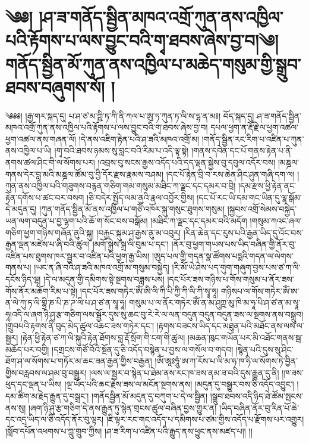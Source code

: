 \setcounter{footnote}{0} 
\chapter{༄༅། །ཤ་ཟ་གནོད་སྦྱིན་མཁའ་འགྲོ་ཀུན་ནས་འཁྱིལ་པའི་རྟོགས་པ་ལས་བྱུང་བའི་གྭ་ཐབས་ཞེས་བྱ་བ།༄། གནོད་སྦྱིན་མོ་ཀུན་ནས་འཁྱིལ་པ་མཆེད་གསུམ་གྱི་སྒྲུབ་ཐབས་བཞུགས་སོ། །}༄༅༅། །རྒྱ་གར་སྐད་དུ། པ་ཤ་ཙ་མ་ཀྵི་ཏ་ཀི་ནི་ཀལ་པ་ཨུ་ཏ་ཀུན་ཏ་ལི་ས་དྷ་ན་མཿ། བོད་སྐད་དུ། ཤ་ཟ་གནོད་སྦྱིན་མཁའ་འགྲོ་ཀུན་ནས་འཁྱིལ་པའི་རྟོགས་པ་ལས་བྱུང་བའི་གྭ་ཐབས་ཞེས་བྱ་བ། དཔལ་ཕྱག་ན་རྡོ་རྗེ་ལ་ཕྱག་འཚལ་ཕྱག་འཚལ་ནས་གཞན་ལོ། །དེ་ནས་འཇིག་རྟེན་པའི་ཤ་ཟའི་མཁའ་འགྲོ་མ། །གནོད་སྦྱིན་རང་རིག་པ་འཛིན་པ་ཀུན་ནས་འཁྱིལ་པ་ཡི། །གྭ་བའི་ཐབས་ཉམས་སུ་བླང་བའི་རིམ་པ་འདི་ལྟ་སྟེ། །གནས་དབེན་དང་པོ་གནས་རྟེན་པ་ནི་ནགས་ཚལ་ཤིང་གི་ལ་སོགས་པར། །འབྲས་བུ་སངས་རྒྱས་འདོད་པའི་དད་ལྡན་སྐྱེས་བུ་དབུལ་འདོར་བས། །མཎྜལ་གནས་དེར་བླ་མའི་མཎྜལ་ཚོམ་བུ་བྱི་དོར་རྫས་རྣམས་བཤམ། །དང་པོ་རྟེན་བྲི་བ་རས་ཆེན་ཤིང་ཤུན་གཞི་དག་ལ། །ཀུན་ནས་འཁྱིལ་པའི་གཟུགས་བརྙན་གཅིག་གམ་གསུམ་མཐིང་ཀ་ལྗང་དང་དམར་བ་བྲི། །དམ་རྫས་ཕྱི་རྟེན་ནང་རྟེན་དགོས་པ་ཚང་བར་བསག །ཅི་བདེར་སྤྱོད་ལམ་ནྱའི་རྣལ་འབྱོར་གྱིས། །དང་པོ་རང་ཡི་དམ་གང་ཡིན་དུ་ལྷ་སྒོམ་དེ་མདུན་དུ། །ཀུན་གནོད་སྦྱིན་མོ་ནས་འཁྱིལ་པ་གཙོ་འཁོར་སྐུ་གསུང་ཐུགས་གསུམ། །སྐྱབས་འགྲོ་སེམས་བསྐྱེད་ཡན་ལག་བདུན་པ་བྱ་ལྷག་པའི་ཆོ་ག་སོང་བས་བསྒོམ། །མཐིང་ཀ་ལྗང་དང་དམར་བའི་མདོག །གསུམ་ཀའང་ཞལ་གཅིག་ཕྱག་གཉིས་གཞོན་ནུའི་སྐུ། །བརྐྱང་སྐུམ་ཤ་རྒྱས་ནུ་མ་འབུར། །རིན་ཆེན་དང་རུས་པའི་རྒྱན་ཡིད་དུ་འོང་བས་རྒྱན་ལྡན་མཛེས་པ་ཞི་བའི་ཚུལ། །མགོ་སྐྱེས་སྐྲ་ལི་བུམ་པ་དང་། །ནོར་བུ་ཕྱག་གཡས་པས་ཡིད་བཞིན་གྱི་ནོར་བུ་འཛིན་པས་ཐུགས་ཁར་སྦྱར་བ་འཛིན་པའི་ཕྱག་རྒྱ་ཡིས། །ཨུད་པལ་གྱི་གདན་སྣ་ཚོགས་པདྨའི་གདན་ལ་ལེགས་གནས་པ། །ཡང་ན་ཞི་བའི་ཤ་ཟའི་མཁའ་འགྲོ་མ་གསུམ་བསྐྱེད། །རི་མོ་ཡེ་ཤེས་པད་གུག་གཞུག་བྱས་པས་ཙ་ཀ་ལི་དངོས་ཉིད་ལྷ། །དེ་ལ་མདུན་གྱི་དམིགས་སྟེ་སྔགས་བཟླས་པས། །དང་པོར་ཟས་གཉིས་པ་གོས་གསུམ་པ་ནོར་ཟས་གོས་ནོར་མཆོག་རིམ་པ་སྟེ། །དང་པོར་ཟས་གཏེར་ཨོཾ་ཨི་ལི་ཀི་པི་ཀྱི་ཀི་ལི་ཀི་སྭཱ་ཧཱ། གཉིསཔ་ལ་གོས་གཏེར་ཨོཾ་ཨ་ན་ལེ་ཀུ་ཏ་ལི་གྷྲི་ཎ་པི་ཎ་ཌ་ལི་པ་ཤ་ཙ་ན་སྭཱ་ཧཱ། གསུམ་པ་ལ་ནོར་གཏེར་ཨོཾ་ན་མ་ཤུཀྵ་མུ་ཁི་མ་ཧཱ་པི་ཤ་ཙ་ན་མ་སྭཱ་ཧཱ།འདི་ལ་ཞག་ཉི་ཤུ་རྩ་གཅིག་ལས་སྦྱོར་དུས་སུ་ཆང་བུ་རེ་རེ་ལ་ལན་བདུན་བདུན་བདུན་ཟས་ལ་སྔགས་ནས་བསྒྲུབ། །གྲུབཔའི་རྟགས་ནི་བུད་མེད་ཚུལ་འཆང་ཟས་གཏེར་དང་། །རྟགས་བཟངས་ཡིད་དང་མཐུན་པའི་མཐོང་ནས་ལས་ལ་སྦྱར། །རྟེན་ཕྱི་རྟེན་ཙ་ཀ་ལི་སྐུའི་རྟེན་ཐོགས་བླ་རྡོ་སྲོག་གི་ངག་གི་ཚུལ། །མཆན་ཁུང་གཡོན་པར་མི་འཐོང་གནས་སྦ་མཆོད་པར་བགྱི། །དགྲངས་གཙོ་བོའི་སྔོན་དུ་ཅི་འདོད་བསྙེན་པ་བྱས་ལ་གསོལ་བ་གདབ། །སྙེན་པའི་དུས་སུ་ཤིང་ཐོག་ཤ་ལ་སོགས་པ་གཏོར་མ་ཆང་ཟན་རྒྱན་གྱིས་བརྒྱན། །ཨོཾ་ཨཱཿཧཱུཾ་ཨ་ཀ་རོས་པ་ལི་མ་ཧ་ཁ་ཧི་ལ་སོགས་ཏེ་བྱིན་གྱིས་བརླབས་ལ་ཤམ་བུ་བསྒྱུར། །ལས་ལ་སྦྱར་བ་སྙེན་པ་ཐེམ་ནས་རང་ཁ་ཟས་ནམ་ཟ་བའི་དུས་རྒྱུན་དུ་ནི། །ཁ་ཟས་ཕུད་དང་ལྡན་པ་ཡིས། །ལྔ་ཡོད་པའི་ཆང་རྗེས་ཟས་ལ་མངོན་སྔགས་ནས། །མདུན་དུ་བསྒྱུར་བས་ཅི་འདོད་འབྱུང་། །དམ་ཚིག་མ་རྗེད་རྒྱུན་དུ་བསྒྲང་། །གནོདསྦྱིན་མོ་མདུན་དུ་བཀུག་པ་དེ་ལ་སྦྱིན། །སྒྲུབ་ཐབས་འདི་ཉིད་ཐེ་ཚོམ་སྤངས་ནས་སུ། །ཞག་ཉི་ཤུ་རྩ་གཅིག་དེ་ནས་རྒྱུན་ཏུ་སྙེན་གྲངས་ཚུལ་བཞིན་བྱས་གྱུར་ན། །ཡིད་བཞིན་ནོར་བུ་རིན་པོ་ཆེ་དང་འདྲ་ཡིད་ལ་ཅི་འདོད་ནོར་བུ་ལྟར། །ཇི་ལྟར་རང་གང་འདོད་པ་དམིགས་པ་ཙམ་གྱིས་འདོད་པ་རྫོགས་པར་འགྱུར། །སློབ་དཔོན་འཕགས་པ་ཀླུ་གྲུབ་ཀྱིས། །ཤ་ཟ་རིག་པ་འཛིན་པའི་རྒྱུད་ནས་ཕྱུང་ནས་མཛད་པ།། །།